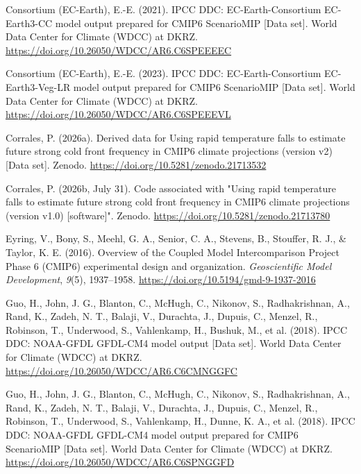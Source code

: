 \documentclass[
]{agujournal2019}
\newlength{\cslhangindent}
\newenvironment{CSLReferences}[2] %
 {\begin{list}{}{%
  \setlength{\itemindent}{0pt}
  \setlength{\leftmargin}{0pt}
  \setlength{\parsep}{0pt}
  \ifodd #1
   \setlength{\leftmargin}{\cslhangindent}
   \setlength{\itemindent}{-1\cslhangindent}
  \fi
  \setlength{\itemsep}{#2\baselineskip}}}
 {\end{list}}
\begin{document}
\begin{CSLReferences}{1}{0}
Consortium (EC-Earth), E.-E. (2021). {IPCC DDC}: {EC-Earth-Consortium
EC-Earth3-CC} model output prepared for {CMIP6 ScenarioMIP} {[}Data
set{]}. World Data Center for Climate (WDCC) at DKRZ.
\url{https://doi.org/10.26050/WDCC/AR6.C6SPEEEEC}

Consortium (EC-Earth), E.-E. (2023). {IPCC DDC}: {EC-Earth-Consortium
EC-Earth3-Veg-LR} model output prepared for {CMIP6 ScenarioMIP} {[}Data
set{]}. World Data Center for Climate (WDCC) at DKRZ.
\url{https://doi.org/10.26050/WDCC/AR6.C6SPEEEVL}

Corrales, P. (2026a). Derived data for {Using} rapid temperature falls
to estimate future strong cold front frequency in {CMIP6} climate
projections (version v2) {[}Data set{]}. Zenodo.
\url{https://doi.org/10.5281/zenodo.21713532}

Corrales, P. (2026b, July 31). Code associated with "{Using} rapid
temperature falls to estimate future strong cold front frequency in
{CMIP6} climate projections (version v1.0) {[}software{]}". Zenodo.
\url{https://doi.org/10.5281/zenodo.21713780}

Eyring, V., Bony, S., Meehl, G. A., Senior, C. A., Stevens, B.,
Stouffer, R. J., \& Taylor, K. E. (2016). Overview of the {Coupled Model
Intercomparison Project Phase} 6 ({CMIP6}) experimental design and
organization. \emph{Geoscientific Model Development}, \emph{9}(5),
1937--1958. \url{https://doi.org/10.5194/gmd-9-1937-2016}

Guo, H., John, J. G., Blanton, C., McHugh, C., Nikonov, S.,
Radhakrishnan, A., Rand, K., Zadeh, N. T., Balaji, V., Durachta, J.,
Dupuis, C., Menzel, R., Robinson, T., Underwood, S., Vahlenkamp, H.,
Bushuk, M., et al. (2018). {IPCC DDC}: {NOAA-GFDL GFDL-CM4} model output
{[}Data set{]}. World Data Center for Climate (WDCC) at DKRZ.
\url{https://doi.org/10.26050/WDCC/AR6.C6CMNGGFC}

Guo, H., John, J. G., Blanton, C., McHugh, C., Nikonov, S.,
Radhakrishnan, A., Rand, K., Zadeh, N. T., Balaji, V., Durachta, J.,
Dupuis, C., Menzel, R., Robinson, T., Underwood, S., Vahlenkamp, H.,
Dunne, K. A., et al. (2018). {IPCC DDC}: {NOAA-GFDL GFDL-CM4} model
output prepared for {CMIP6 ScenarioMIP} {[}Data set{]}. World Data
Center for Climate (WDCC) at DKRZ.
\url{https://doi.org/10.26050/WDCC/AR6.C6SPNGGFD}


\end{CSLReferences}
\end{document}
